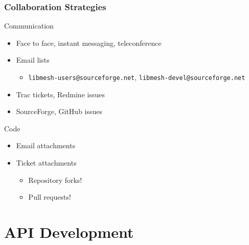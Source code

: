 \documentclass[mathserif]{beamer}
\begin{document}
\begin{frame}
\frametitle{Collaboration Strategies}

\begin{block}{Communication}
\begin{itemize}
	\item Face to face, instant messaging, teleconference
	\item Email lists
	\begin{itemize}
		\item \texttt{libmesh-users@sourceforge.net},
			\texttt{libmesh-devel@sourceforge.net}
	\end{itemize}
	\item Trac tickets, Redmine issues
	\item SourceForge, GitHub issues
\end{itemize}
\end{block}

\begin{block}{Code}
\begin{itemize}
	\item Email attachments
	\item Ticket attachments
	\begin{itemize}
		\item Repository forks!
		\item Pull requests!
	\end{itemize}
\end{itemize}
\end{block}

\end{frame}



\section{API Development}
\end{document}
